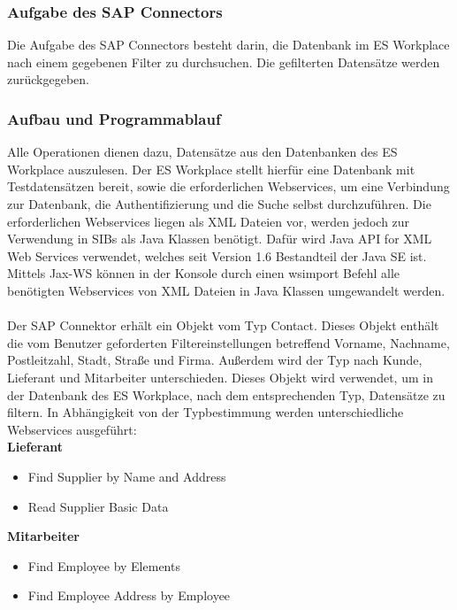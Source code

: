 \subsubsection{Aufgabe des SAP Connectors}

Die Aufgabe des SAP Connectors besteht darin, die Datenbank im ES Workplace nach einem 
gegebenen Filter zu durchsuchen. Die gefilterten Datensätze werden zurückgegeben. 

\subsubsection{Aufbau und Programmablauf}

Alle Operationen dienen dazu, Datensätze aus den Datenbanken des ES Workplace auszulesen. Der ES Workplace stellt hierfür 
eine Datenbank mit Testdatensätzen bereit, sowie die erforderlichen Webservices, um eine Verbindung zur Datenbank, 
die Authentifizierung und die Suche selbst durchzuführen. Die erforderlichen Webservices liegen als XML Dateien vor, werden 
jedoch zur Verwendung in SIBs als Java Klassen benötigt. Dafür wird Java API for XML Web Services verwendet, welches seit
Version 1.6  Bestandteil der Java SE ist. Mittels Jax-WS können in der Konsole durch einen wsimport Befehl alle benötigten 
Webservices von XML Dateien in Java Klassen umgewandelt werden. 
\ \\
Der SAP Connektor erhält ein Objekt vom Typ Contact. Dieses Objekt enthält die vom Benutzer geforderten Filtereinstellungen 
betreffend Vorname, Nachname, Postleitzahl, Stadt, Straße und Firma. Außerdem wird der Typ nach Kunde, Lieferant und 
Mitarbeiter unterschieden. Dieses Objekt wird verwendet, um in der Datenbank des ES Workplace, nach dem entsprechenden Typ,
Datensätze zu filtern. In Abhängigkeit von der Typbestimmung werden unterschiedliche Webservices ausgeführt:
\ \\

\textbf{Lieferant}
\begin{itemize}
\item Find Supplier by Name and Address
\item Read Supplier Basic Data 
\end{itemize}

\textbf{Mitarbeiter}
\begin{itemize}
\item Find Employee by Elements
\item Find Employee Address by Employee
\end{itemize}

